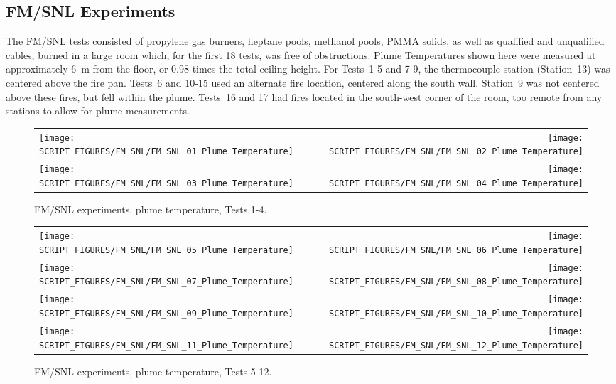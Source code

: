 \clearpage

\subsection{FM/SNL Experiments}

\label{FM/SNL_Plume}

The FM/SNL tests consisted of propylene gas burners, heptane pools, methanol pools, PMMA solids, as well as qualified and unqualified cables, burned in a large room which, for the first 18 tests, was free of obstructions. Plume Temperatures shown here were measured at approximately 6~m from the floor, or 0.98 times the total ceiling height. For Tests~1-5 and 7-9, the thermocouple station (Station~13) was centered above the fire pan. Tests~6 and 10-15 used an alternate fire location, centered along the south wall. Station~9 was not centered above these fires, but fell within the plume. Tests~16 and 17 had fires located in the south-west corner of the room, too remote from any stations to allow for plume measurements.

\begin{figure}[!h]
\begin{tabular*}{\textwidth}{l@{\extracolsep{\fill}}r}
\texttt{[image: SCRIPT\_FIGURES/FM\_SNL/FM\_SNL\_01\_Plume\_Temperature]} &
\texttt{[image: SCRIPT\_FIGURES/FM\_SNL/FM\_SNL\_02\_Plume\_Temperature]} \\
\texttt{[image: SCRIPT\_FIGURES/FM\_SNL/FM\_SNL\_03\_Plume\_Temperature]} &
\texttt{[image: SCRIPT\_FIGURES/FM\_SNL/FM\_SNL\_04\_Plume\_Temperature]}
\end{tabular*}
\caption[FM/SNL experiments, plume temperature, Tests 1-4]
{FM/SNL experiments, plume temperature, Tests 1-4.}
\label{FM_SNL_Plume_1}
\end{figure}

\newpage

\begin{figure}[p]
\begin{tabular*}{\textwidth}{l@{\extracolsep{\fill}}r}
\texttt{[image: SCRIPT\_FIGURES/FM\_SNL/FM\_SNL\_05\_Plume\_Temperature]} &
\texttt{[image: SCRIPT\_FIGURES/FM\_SNL/FM\_SNL\_06\_Plume\_Temperature]} \\
\texttt{[image: SCRIPT\_FIGURES/FM\_SNL/FM\_SNL\_07\_Plume\_Temperature]} &
\texttt{[image: SCRIPT\_FIGURES/FM\_SNL/FM\_SNL\_08\_Plume\_Temperature]} \\
\texttt{[image: SCRIPT\_FIGURES/FM\_SNL/FM\_SNL\_09\_Plume\_Temperature]} &
\texttt{[image: SCRIPT\_FIGURES/FM\_SNL/FM\_SNL\_10\_Plume\_Temperature]} \\
\texttt{[image: SCRIPT\_FIGURES/FM\_SNL/FM\_SNL\_11\_Plume\_Temperature]} &
\texttt{[image: SCRIPT\_FIGURES/FM\_SNL/FM\_SNL\_12\_Plume\_Temperature]}
\end{tabular*}
\caption[FM/SNL experiments, plume temperature, Tests 5-12]
{FM/SNL experiments, plume temperature, Tests 5-12.}
\label{FM_SNL_Plume_2}
\end{figure}

